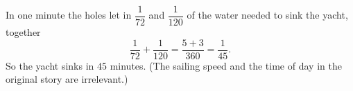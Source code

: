 In one minute the holes let in $\dfrac{1}{72}$ and $\dfrac{1}{120}$ of the water needed to sink the yacht, together
\[
\dfrac{1}{72}+\dfrac{1}{120}=\dfrac{5+3}{360}=\dfrac{1}{45}.
\]
So the yacht sinks in $\boxed{45}$ minutes. (The sailing speed and the time of day in the original story are irrelevant.)
